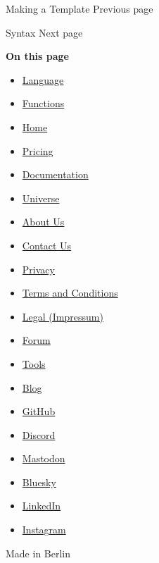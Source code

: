 \href{/docs/tutorial/making-a-template/}{\pandocbounded{}}

{ Making a Template } { Previous page }

\href{/docs/reference/syntax/}{\pandocbounded{}}

{ Syntax } { Next page }

\textbf{On this page}

\begin{itemize}
\tightlist
\item
  \hyperref[language]{Language}
\item
  \hyperref[functions]{Functions}
\end{itemize}

\begin{itemize}
\tightlist
\item
  \href{/}{Home}
\item
  \href{/pricing/}{Pricing}
\item
  \href{/docs/}{Documentation}
\item
  \href{/universe/}{Universe}
\item
  \href{/about/}{About Us}
\item
  \href{/contact/}{Contact Us}
\item
  \href{/privacy/}{Privacy}
\item
  \href{https://typst.app/terms}{Terms and Conditions}
\item
  \href{/legal/}{Legal (Impressum)}
\end{itemize}

\begin{itemize}
\tightlist
\item
  \href{https://forum.typst.app}{Forum}
\item
  \href{/tools/}{Tools}
\item
  \href{/blog/}{Blog}
\item
  \href{https://github.com/typst/}{GitHub}
\item
  \href{https://discord.gg/2uDybryKPe}{Discord}
\item
  \href{https://mastodon.social/@typst}{Mastodon}
\item
  \href{https://bsky.app/profile/typst.app}{Bluesky}
\item
  \href{https://www.linkedin.com/company/typst/}{LinkedIn}
\item
  \href{https://instagram.com/typstapp/}{Instagram}
\end{itemize}

Made in Berlin
